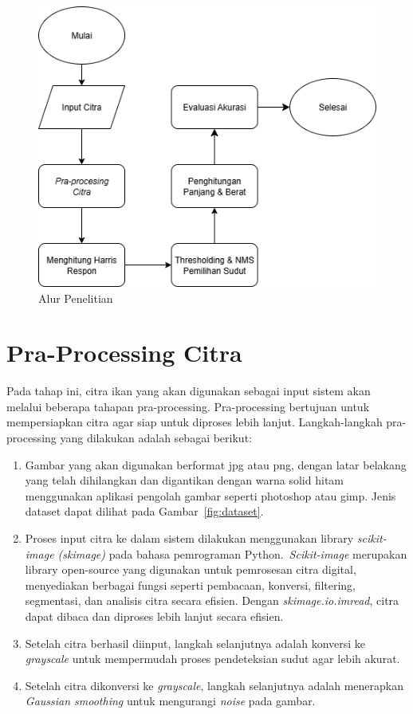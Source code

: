 \begin{figure}
    \centering
    \includegraphics[scale= 0.7]{gambar/Alur Penelitian.png}
    \caption{Alur Penelitian}\label{Alur Penelitian}
\end{figure}

\section{Pra-Processing Citra}
    Pada tahap ini, citra ikan yang akan digunakan sebagai input sistem akan melalui beberapa tahapan pra-processing.
Pra-processing bertujuan untuk mempersiapkan citra agar siap untuk diproses lebih lanjut. Langkah-langkah pra-processing yang dilakukan adalah sebagai berikut:
\begin{enumerate}
    \item Gambar yang akan digunakan berformat jpg atau png, dengan latar belakang yang telah dihilangkan dan digantikan dengan warna solid hitam menggunakan aplikasi pengolah gambar seperti photoshop atau gimp. Jenis dataset dapat dilihat pada Gambar~\ref{fig:dataset}.
    \item Proses input citra ke dalam sistem dilakukan menggunakan library \emph{scikit-image (skimage)} pada bahasa pemrograman Python.~\emph{Scikit-image} merupakan library open-source yang digunakan untuk pemrosesan citra digital, menyediakan berbagai fungsi seperti pembacaan, konversi, filtering, segmentasi, dan analisis citra secara efisien. Dengan \emph{skimage.io.imread}, citra dapat dibaca dan diproses lebih lanjut secara efisien.
    \item Setelah citra berhasil diinput, langkah selanjutnya adalah konversi ke \emph{grayscale} untuk mempermudah proses pendeteksian sudut agar lebih akurat.
    \item Setelah citra dikonversi ke \emph{grayscale}, langkah selanjutnya adalah menerapkan \emph{Gaussian smoothing} untuk mengurangi \emph{noise} pada gambar.
\end{enumerate}

